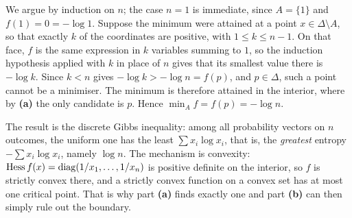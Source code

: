 \begin{exercisesolution}
\begin{enumerate}[label=\textbf{(\alph*)}]
    We argue by induction on $n$; the case $n=1$ is immediate, since $A=\{1\}$ and $f(1)=0=-\log1$.
    Suppose the minimum were attained at a point $x \in \Delta \setminus A$, so that exactly
    $k$ of the coordinates are positive, with $1 \le k \le n-1$. On that face, $f$ is the same
    expression in $k$ variables summing to $1$, so the induction hypothesis applied with $k$ in
    place of $n$ gives that its smallest value there is $-\log k$. Since $k < n$ gives $-\log k > -\log n = f(p)$, and
    $p \in \Delta$, such a point cannot be a minimiser. The minimum is therefore attained in the
    interior, where by \textbf{(a)} the only candidate is $p$. Hence $\min_A f = f(p) = -\log n$.
\end{enumerate}
\begin{remark}
The result is the discrete Gibbs inequality: among all probability vectors on $n$ outcomes, the
uniform one has the least $\sum x_i\log x_i$, that is, the \emph{greatest} entropy $-\sum x_i \log
x_i$, namely $\log n$. The mechanism is convexity: $\operatorname{Hess} f(x) = \operatorname{diag}(1/x_1,\dots,1/x_n)$ is
positive definite on the interior, so $f$ is strictly convex there, and a strictly convex function on
a convex set has at most one critical point. That is why part \textbf{(a)} finds exactly one and
part \textbf{(b)} can then simply rule out the boundary.
\end{remark}
\end{exercisesolution}

